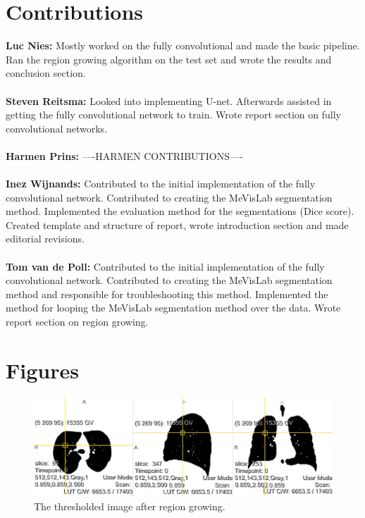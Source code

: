 \documentclass[a4paper,10pt]{article}
\numberwithin{equation}{section} %
\numberwithin{figure}{section} %
\numberwithin{table}{section} %
\begin{document}
\clearpage

\appendix
\section{Contributions}

\textbf{Luc Nies:} Mostly worked on the fully convolutional and made the basic pipeline. Ran the region growing algorithm on the test set and wrote the results and conclusion section.\\
\\
\textbf{Steven Reitsma:} Looked into implementing U-net. Afterwards assisted in getting the fully convolutional network to train. Wrote report section on fully convolutional networks.\\
\\
\textbf{Harmen Prins:} ----HARMEN CONTRIBUTIONS----\\
\\
\textbf{Inez Wijnands:} Contributed to the initial implementation of the fully convolutional network. Contributed to creating the MeVisLab segmentation method. Implemented the evaluation method for the segmentations (Dice score). Created template and structure of report, wrote introduction section and made editorial revisions.\\
\\
\textbf{Tom van de Poll:} Contributed to the initial implementation of the fully convolutional network. Contributed to creating the MeVisLab segmentation method and responsible for troubleshooting this method. Implemented the method for looping the MeVisLab segmentation method over the data. Wrote report section on region growing.

\section{Figures}

\begin{figure}[h]
	\centering
	\includegraphics[width=\textwidth]{regiongrowing}
    \caption{The thresholded image after region growing.}
    \label{fig:reg-gro}
\end{figure}
\end{document}
